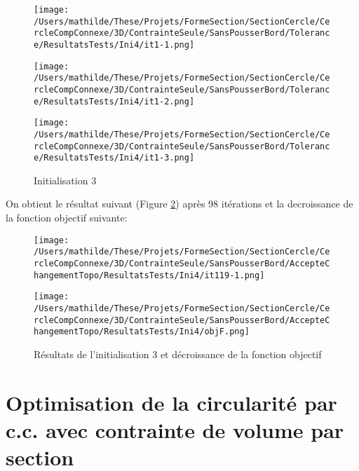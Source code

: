 \documentclass[11pt,a4paper]{article}
\begin{document}
\begin{figure}[H]
	\label{fig:cercleseul3Daini3}
	\begin{minipage}{0.32\textwidth}
		\centering
		\texttt{[image: /Users/mathilde/These/Projets/FormeSection/SectionCercle/CercleCompConnexe/3D/ContrainteSeule/SansPousserBord/Tolerance/ResultatsTests/Ini4/it1-1.png]}
	\end{minipage}
	\begin{minipage}{0.32\textwidth}
		\centering
		\texttt{[image: /Users/mathilde/These/Projets/FormeSection/SectionCercle/CercleCompConnexe/3D/ContrainteSeule/SansPousserBord/Tolerance/ResultatsTests/Ini4/it1-2.png]}
	\end{minipage}
	\begin{minipage}{0.32\textwidth}
		\centering
		\texttt{[image: /Users/mathilde/These/Projets/FormeSection/SectionCercle/CercleCompConnexe/3D/ContrainteSeule/SansPousserBord/Tolerance/ResultatsTests/Ini4/it1-3.png]}
	\end{minipage}	
	\caption{Initialisation 3}	
\end{figure}

On obtient le résultat suivant (Figure \ref{fig:cercleseul3Daini3Fin}) après 98 itérations et la decroissance de la fonction objectif suivante:

\begin{figure}[H]
	\label{fig:cercleseul3Daini3Fin}
	\begin{minipage}{0.45\textwidth}
		\centering
		\texttt{[image: /Users/mathilde/These/Projets/FormeSection/SectionCercle/CercleCompConnexe/3D/ContrainteSeule/SansPousserBord/AccepteChangementTopo/ResultatsTests/Ini4/it119-1.png]}
	\end{minipage}	
	\begin{minipage}{0.45\textwidth}
		\centering
		\texttt{[image: /Users/mathilde/These/Projets/FormeSection/SectionCercle/CercleCompConnexe/3D/ContrainteSeule/SansPousserBord/AccepteChangementTopo/ResultatsTests/Ini4/objF.png]}
	\end{minipage}	
	\caption{Résultats de l'initialisation 3 et décroissance de la fonction objectif}	
\end{figure}

\section{Optimisation de la circularité par c.c. avec contrainte de volume par section}
\end{document}
